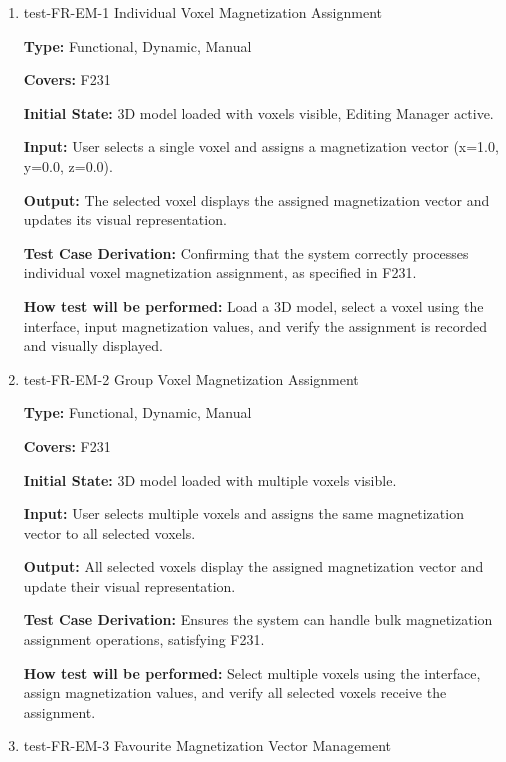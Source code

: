 \documentclass[12pt, titlepage]{article}
\begin{document}
\begin{enumerate}

\item{test-FR-EM-1 Individual Voxel Magnetization Assignment\\}

\textbf{Type:} Functional, Dynamic, Manual

\textbf{Covers:} F231
					
\textbf{Initial State:} 3D model loaded with voxels visible, Editing Manager active.
					
\textbf{Input:} User selects a single voxel and assigns a magnetization vector (x=1.0, y=0.0, z=0.0).
					
\textbf{Output:} The selected voxel displays the assigned magnetization vector and updates its visual representation.

\textbf{Test Case Derivation:} Confirming that the system correctly processes individual voxel magnetization assignment, as specified in F231.
					
\textbf{How test will be performed:} Load a 3D model, select a voxel using the interface, input magnetization values, and verify the assignment is recorded and visually displayed.

\item{test-FR-EM-2 Group Voxel Magnetization Assignment\\}

\textbf{Type:} Functional, Dynamic, Manual

\textbf{Covers:} F231
					
\textbf{Initial State:} 3D model loaded with multiple voxels visible.
					
\textbf{Input:} User selects multiple voxels and assigns the same magnetization vector to all selected voxels.
					
\textbf{Output:} All selected voxels display the assigned magnetization vector and update their visual representation.

\textbf{Test Case Derivation:} Ensures the system can handle bulk magnetization assignment operations, satisfying F231.
					
\textbf{How test will be performed:} Select multiple voxels using the interface, assign magnetization values, and verify all selected voxels receive the assignment.

\item{test-FR-EM-3 Favourite Magnetization Vector Management\\}


\end{enumerate}
\end{document}
